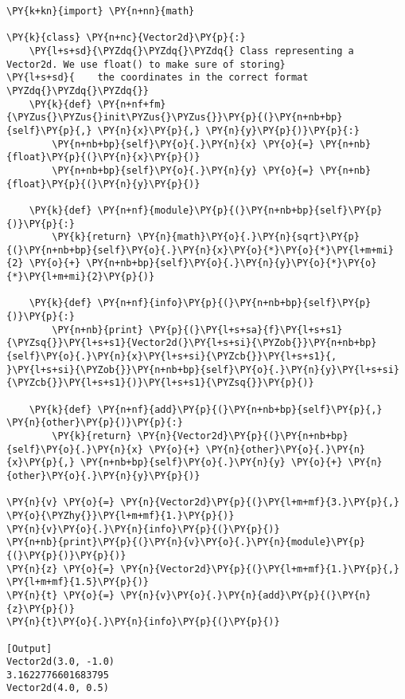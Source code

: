 \begin{Verbatim}[label=\makebox{\url{https://github.com/lucabaldini/cmepda/tree/master/slides/latex/snippets/vector2d\_naive.py}},commandchars=\\\{\}]
\PY{k+kn}{import} \PY{n+nn}{math}

\PY{k}{class} \PY{n+nc}{Vector2d}\PY{p}{:}
    \PY{l+s+sd}{\PYZdq{}\PYZdq{}\PYZdq{} Class representing a Vector2d. We use float() to make sure of storing}
\PY{l+s+sd}{    the coordinates in the correct format \PYZdq{}\PYZdq{}\PYZdq{}}
    \PY{k}{def} \PY{n+nf+fm}{\PYZus{}\PYZus{}init\PYZus{}\PYZus{}}\PY{p}{(}\PY{n+nb+bp}{self}\PY{p}{,} \PY{n}{x}\PY{p}{,} \PY{n}{y}\PY{p}{)}\PY{p}{:}
        \PY{n+nb+bp}{self}\PY{o}{.}\PY{n}{x} \PY{o}{=} \PY{n+nb}{float}\PY{p}{(}\PY{n}{x}\PY{p}{)}
        \PY{n+nb+bp}{self}\PY{o}{.}\PY{n}{y} \PY{o}{=} \PY{n+nb}{float}\PY{p}{(}\PY{n}{y}\PY{p}{)}

    \PY{k}{def} \PY{n+nf}{module}\PY{p}{(}\PY{n+nb+bp}{self}\PY{p}{)}\PY{p}{:}
        \PY{k}{return} \PY{n}{math}\PY{o}{.}\PY{n}{sqrt}\PY{p}{(}\PY{n+nb+bp}{self}\PY{o}{.}\PY{n}{x}\PY{o}{*}\PY{o}{*}\PY{l+m+mi}{2} \PY{o}{+} \PY{n+nb+bp}{self}\PY{o}{.}\PY{n}{y}\PY{o}{*}\PY{o}{*}\PY{l+m+mi}{2}\PY{p}{)}

    \PY{k}{def} \PY{n+nf}{info}\PY{p}{(}\PY{n+nb+bp}{self}\PY{p}{)}\PY{p}{:}
        \PY{n+nb}{print} \PY{p}{(}\PY{l+s+sa}{f}\PY{l+s+s1}{\PYZsq{}}\PY{l+s+s1}{Vector2d(}\PY{l+s+si}{\PYZob{}}\PY{n+nb+bp}{self}\PY{o}{.}\PY{n}{x}\PY{l+s+si}{\PYZcb{}}\PY{l+s+s1}{, }\PY{l+s+si}{\PYZob{}}\PY{n+nb+bp}{self}\PY{o}{.}\PY{n}{y}\PY{l+s+si}{\PYZcb{}}\PY{l+s+s1}{)}\PY{l+s+s1}{\PYZsq{}}\PY{p}{)}

    \PY{k}{def} \PY{n+nf}{add}\PY{p}{(}\PY{n+nb+bp}{self}\PY{p}{,} \PY{n}{other}\PY{p}{)}\PY{p}{:}
        \PY{k}{return} \PY{n}{Vector2d}\PY{p}{(}\PY{n+nb+bp}{self}\PY{o}{.}\PY{n}{x} \PY{o}{+} \PY{n}{other}\PY{o}{.}\PY{n}{x}\PY{p}{,} \PY{n+nb+bp}{self}\PY{o}{.}\PY{n}{y} \PY{o}{+} \PY{n}{other}\PY{o}{.}\PY{n}{y}\PY{p}{)}

\PY{n}{v} \PY{o}{=} \PY{n}{Vector2d}\PY{p}{(}\PY{l+m+mf}{3.}\PY{p}{,} \PY{o}{\PYZhy{}}\PY{l+m+mf}{1.}\PY{p}{)}
\PY{n}{v}\PY{o}{.}\PY{n}{info}\PY{p}{(}\PY{p}{)}
\PY{n+nb}{print}\PY{p}{(}\PY{n}{v}\PY{o}{.}\PY{n}{module}\PY{p}{(}\PY{p}{)}\PY{p}{)}
\PY{n}{z} \PY{o}{=} \PY{n}{Vector2d}\PY{p}{(}\PY{l+m+mf}{1.}\PY{p}{,} \PY{l+m+mf}{1.5}\PY{p}{)}
\PY{n}{t} \PY{o}{=} \PY{n}{v}\PY{o}{.}\PY{n}{add}\PY{p}{(}\PY{n}{z}\PY{p}{)}
\PY{n}{t}\PY{o}{.}\PY{n}{info}\PY{p}{(}\PY{p}{)}

[Output]
Vector2d(3.0, -1.0)
3.1622776601683795
Vector2d(4.0, 0.5)
\end{Verbatim}